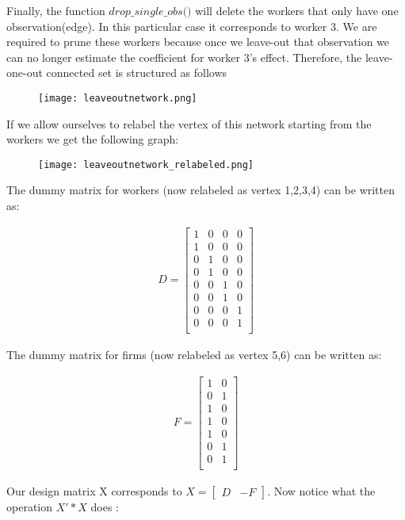 \documentclass[12pt]{article}
\begin{document}
Finally, the function $\textit{drop\_single\_obs()}$ will delete the workers that only have one observation(edge). In this particular case it corresponds to worker 3. We are required to prune these workers because once we leave-out that observation we can no longer estimate the coefficient for worker 3's effect. Therefore, the leave-one-out connected set is structured as follows

\begin{figure}[h!]
    \centering
\texttt{[image: leaveoutnetwork.png]}    
\end{figure}

If we allow ourselves to relabel the vertex of this network starting from the workers we get the following graph: 

\begin{figure}[H]
    \centering
\texttt{[image: leaveoutnetwork\_relabeled.png]}    
\end{figure}


The dummy matrix for workers (now relabeled as vertex 1,2,3,4) can be written as: 

\begin{align*}
D = \begin{bmatrix}
1 & 0 & 0& 0\\
1 & 0 & 0& 0\\
0 & 1 & 0& 0\\
0 & 1 & 0& 0\\
0 & 0 & 1& 0\\
0 & 0 & 1& 0\\
0 & 0 & 0& 1\\
0 & 0 & 0& 1\\
\end{bmatrix} 
\end{align*}


The dummy matrix for firms (now relabeled as vertex 5,6) can be written as: 

\begin{align*}
F = \begin{bmatrix}
1 & 0 \\
0 & 1 \\
1 & 0 \\
1 & 0 \\
1 & 0 \\
0 & 1 \\
0 & 1 \\
\end{bmatrix} 
\end{align*}

Our design matrix X corresponds to  $X = \begin{bmatrix} D & -F \end{bmatrix}$. Now notice what the operation $X'*X$ does : 
\end{document}
